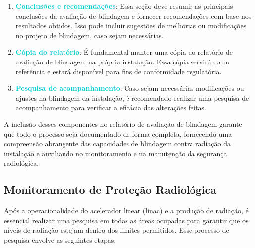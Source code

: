 \documentclass[11pt,a4paper]{article}
\begin{document}
\begin{enumerate}[label=\textcolor{CarnationPink}{(\roman*)}]
		\item \textcolor{DarkTurquoise}{\textbf{Conclusões e recomendações}}: Essa seção deve resumir as principais conclusões da avaliação de blindagem e fornecer recomendações com base nos resultados obtidos. Isso pode incluir sugestões de melhorias ou modificações no projeto de blindagem, caso sejam necessárias.

		\item \textcolor{DarkTurquoise}{\textbf{Cópia do relatório}}: É fundamental manter uma cópia do relatório de avaliação de blindagem na própria instalação. Essa cópia servirá como referência e estará disponível para fins de conformidade regulatória.

		\item \textcolor{DarkTurquoise}{\textbf{Pesquisa de acompanhamento}}: Caso sejam necessárias modificações ou ajustes na blindagem da instalação, é recomendado realizar uma pesquisa de acompanhamento para verificar a eficácia das alterações feitas.
	\end{enumerate}

	A inclusão desses componentes no relatório de avaliação de blindagem garante que todo o processo seja documentado de forma completa, fornecendo uma compreensão abrangente das capacidades de blindagem contra radiação da instalação e auxiliando no monitoramento e na manutenção da segurança radiológica.

\subsection*{Monitoramento de Proteção Radiológica}

	Após a operacionalidade do acelerador linear (linac) e a produção de radiação, é essencial realizar uma pesquisa em todas as áreas ocupadas para garantir que os níveis de radiação estejam dentro dos limites permitidos. Esse processo de pesquisa envolve as seguintes etapas:
\end{document}
